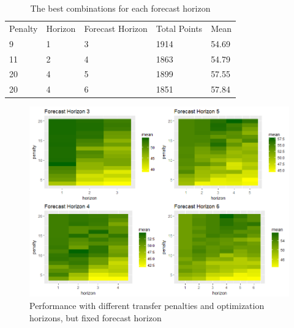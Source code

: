 \begin{table}[H]
\centering
\caption{The best combinations for each forecast horizon}
\label{tab:top_5}
\begin{tabular}{lllll}
Penalty & Horizon & Forecast Horizon & Total Points & Mean  \\
9       & 1       & 3                & 1914         & 54.69 \\
11      & 2       & 4                & 1863         & 54.79 \\
20      & 4       & 5                & 1899         & 57.55 \\
20      & 4       & 6                & 1851         & 57.84
\end{tabular}
\end{table}

\begin{figure}[H]
    \centering
    \includegraphics[scale=0.55]{fig/chapter_6/parameter_choice_fixed_f_hor.png}
    \caption{Performance with different transfer penalties and optimization horizons, but fixed forecast horizon}
\label{fig:fixed_f_hor}    
\end{figure}


